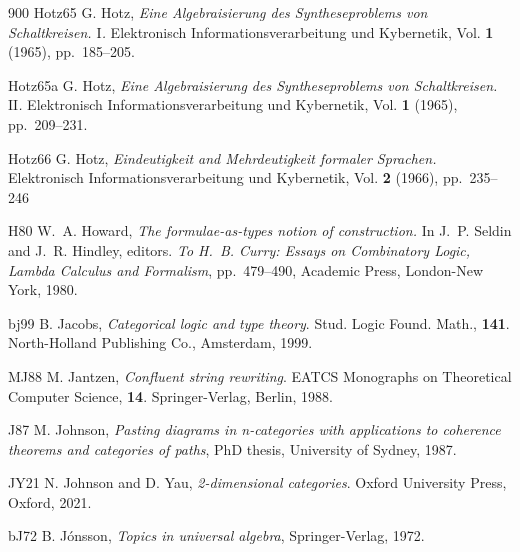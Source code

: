 \begin{thebibliography}{900}
\bibitem%
{Hotz65} G. Hotz, \emph{Eine Algebraisierung des Syntheseproblems von Schaltkreisen. $\mathrm{I}$.} 
Elektronisch Informationsverarbeitung und Kybernetik, Vol. \textbf{1} (1965), pp.~185--205.

\bibitem%
{Hotz65a} G. Hotz, \emph{Eine Algebraisierung des Syntheseproblems von Schaltkreisen. $\mathrm{II}$.} 
Elektronisch Informationsverarbeitung und Kybernetik, Vol. \textbf{1} (1965), pp.~209--231.

\bibitem%
{Hotz66} G. Hotz, \emph{Eindeutigkeit and Mehrdeutigkeit formaler Sprachen.}
Elektronisch Informationsverarbeitung und Kybernetik, Vol. \textbf{2} (1966), pp.~235--246

\bibitem%
{H80} W.~A. Howard, \emph{The formulae-as-types notion of construction.} In J.~P. Seldin and J.~R. Hindley, editors. \emph{To H.~B. Curry: Essays on Combinatory Logic, Lambda Calculus and Formalism}, pp.~479--490, Academic Press, London-New York, 1980.

\bibitem%
{bj99} B. Jacobs, \emph{Categorical logic and type theory}. Stud. Logic Found. Math., \textbf{141}. North-Holland Publishing Co., Amsterdam, 1999.

\bibitem%
{MJ88} M. Jantzen,  
\emph{Confluent string rewriting}.
EATCS Monographs on Theoretical Computer Science, \textbf{14}. Springer-Verlag, Berlin, 1988.

\bibitem%
{J87} M. Johnson, \emph{Pasting diagrams in n-categories with applications to coherence theorems and categories of paths}, PhD thesis, University of Sydney, 1987.

\bibitem%
{JY21} N. Johnson and D. Yau, \emph{2-dimensional categories}. Oxford University Press, Oxford, 2021.

%

\bibitem%
{bJ72}
B. J\'{o}nsson, \emph{Topics in universal algebra}, Springer-Verlag, 1972.




\end{thebibliography}
